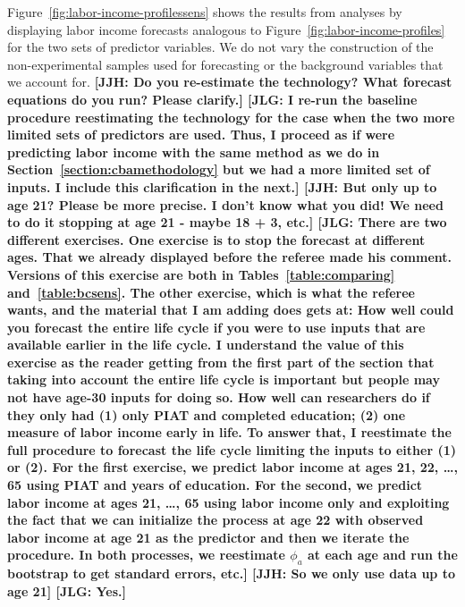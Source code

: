 Figure~\ref{fig:labor-income-profilessens} shows the results from analyses by displaying labor income forecasts analogous to Figure~\ref{fig:labor-income-profiles} for the two sets of predictor variables. We do not vary the construction of the non-experimental samples used for forecasting or the background variables that we account for. \textbf{[JJH: Do you re-estimate the technology? What forecast equations do you run? Please clarify.] [JLG: I re-run the baseline procedure reestimating the technology for the case when the two more limited sets of predictors are used. Thus, I proceed as if were predicting labor income with the same method as we do in Section~\ref{section:cbamethodology} but we had a more limited set of inputs. I include this clarification in the next.] [JJH: But only up to age 21? Please be more precise. I don't know what you did! We need to do it stopping at age 21 - maybe 18 + 3, etc.] [JLG: There are two different exercises. One exercise is to stop the forecast at different ages. That we already displayed before the referee made his comment. Versions of this exercise are both in Tables~\ref{table:comparing} and~\ref{table:bcsens}. The other exercise, which is what the referee wants, and the material that I am adding does gets at: How well could you forecast the entire life cycle if you were to use inputs that are available earlier in the life cycle. I understand the value of this exercise as the reader getting from the first part of the section that taking into account the entire life cycle is important but people may not have age-30 inputs for doing so. How well can researchers do if they only had (1) only PIAT and completed education; (2) one measure of labor income early in life. To answer that, I reestimate the full procedure to forecast the life cycle limiting the inputs to either (1) or (2). For the first exercise, we predict labor income at ages 21, 22, \ldots, 65 using PIAT and years of education. For the second, we predict labor income at ages 21, \ldots, 65 using labor income only and exploiting the fact that we can initialize the process at age 22 with observed labor income at age 21 as the predictor and then we iterate the procedure. In both processes, we reestimate $\phi_{a}$ at each age and run the bootstrap to get standard errors, etc.] [JJH: So we only use data up to age 21] [JLG: Yes.]} 

